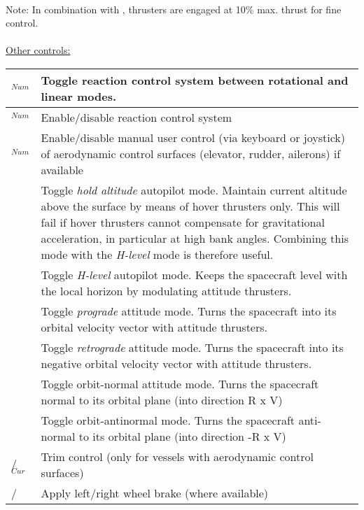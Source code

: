 \documentclass[Orbiter User Manual.tex]{subfiles}
\begin{document}
\noindent
\\
Note: In combination with \Ctrl, thrusters are engaged at 10\% max. thrust for fine control.\\
\\
\underline{Other controls:}

	\begin{longtable}{ |p{}|p{}| }
	\hline\rule{0pt}{2ex}
	\keystroke{/}$_{Num}$ & Toggle reaction control system between rotational and linear modes.\\
	\hline\rule{0pt}{2ex}
	\Ctrl\keystroke{/}$_{Num}$ & Enable/disable reaction control system\\
	\hline\rule{0pt}{2ex}
	\Alt\keystroke{/}$_{Num}$ & Enable/disable manual user control (via keyboard or joystick) of aerodynamic control surfaces (elevator, rudder, ailerons) if available\\
	\hline\rule{0pt}{2ex}
	\keystroke{A} & Toggle \textit{hold altitude} autopilot mode. Maintain current altitude above the surface by means of hover thrusters only. This will fail if hover thrusters cannot compensate for gravitational acceleration, in particular at high bank angles. Combining this mode with the \textit{H-level} mode is therefore useful.\\
	\hline\rule{0pt}{2ex}
	\keystroke{L} & Toggle \textit{H-level} autopilot mode. Keeps the spacecraft level with the local horizon by modulating attitude thrusters.\\
	\hline\rule{0pt}{2ex}
	\keystroke{[} & Toggle \textit{prograde} attitude mode. Turns the spacecraft into its orbital velocity vector with attitude thrusters.\\
	\hline\rule{0pt}{2ex}
	\keystroke{]} & Toggle \textit{retrograde} attitude mode. Turns the spacecraft into its negative orbital velocity vector with attitude thrusters.\\
	\hline\rule{0pt}{2ex}
	\keystroke{;} & Toggle orbit-normal attitude mode. Turns the spacecraft normal to its orbital plane (into direction R x V)\\
	\hline\rule{0pt}{2ex}
	\keystroke{'} & Toggle orbit-antinormal mode. Turns the spacecraft anti-normal to its orbital plane (into direction -R x V)\\
	\hline\rule{0pt}{2ex}
	\keystroke{Ins}/\keystroke{Del}$_{Cur}$ & Trim control (only for vessels with aerodynamic control surfaces)\\
	\hline\rule{0pt}{2ex}
	\keystroke{,}/\keystroke{.} & Apply left/right wheel brake (where available)\\
	\hline
	\end{longtable}
\end{document}
